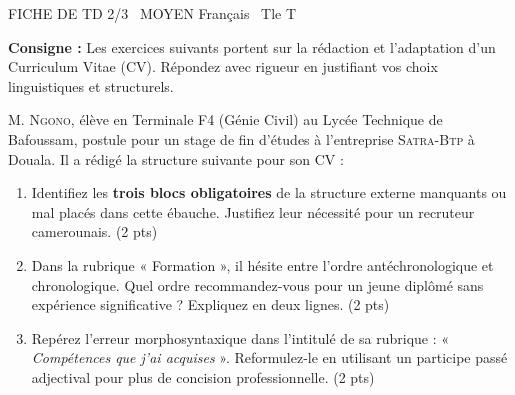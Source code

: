 \documentclass[11pt]{article}
\begin{document}
\begin{tcolorbox}[enhanced,colback=popink,colframe=popink,arc=10pt,boxrule=0pt,left=12pt,right=12pt,top=9pt,bottom=9pt]
{\color{white}\popxbold\small FICHE DE TD 2/3 \textbullet\ MOYEN \hfill Français \textbullet\ Tle T\par}
\end{tcolorbox}
\vspace{4pt}
\noindent \textbf{Consigne :} Les exercices suivants portent sur la rédaction et l'adaptation d'un Curriculum Vitae (CV). Répondez avec rigueur en justifiant vos choix linguistiques et structurels.

\begin{exercice}
M. \textsc{Ngono}, élève en Terminale F4 (Génie Civil) au Lycée Technique de Bafoussam, postule pour un stage de fin d'études à l'entreprise \textsc{Satra-Btp} à Douala. Il a rédigé la structure suivante pour son CV :
\begin{enumerate}
    \item Identifiez les \textbf{trois blocs obligatoires} de la structure externe manquants ou mal placés dans cette ébauche. Justifiez leur nécessité pour un recruteur camerounais. \hfill (2 pts)
    \item Dans la rubrique « Formation », il hésite entre l'ordre antéchronologique et chronologique. Quel ordre recommandez-vous pour un jeune diplômé sans expérience significative ? Expliquez en deux lignes. \hfill (2 pts)
    \item Repérez l'erreur morphosyntaxique dans l'intitulé de sa rubrique : « \textit{Compétences que j'ai acquises} ». Reformulez-le en utilisant un participe passé adjectival pour plus de concision professionnelle. \hfill (2 pts)
\end{enumerate}
\end{exercice}
\end{document}
